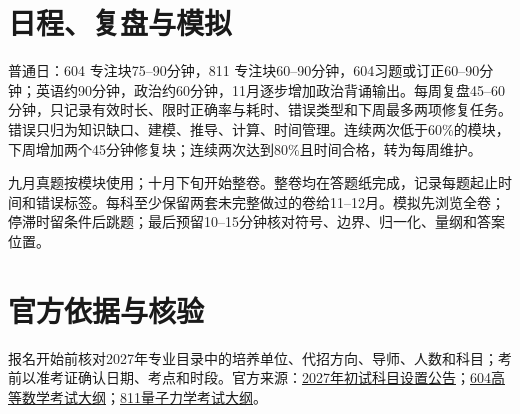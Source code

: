 \documentclass[UTF8,a4paper]{ctexart}
\begin{document}
\section{日程、复盘与模拟}
普通日：604 专注块75--90分钟，811 专注块60--90分钟，604习题或订正60--90分钟；英语约90分钟，政治约60分钟，11月逐步增加政治背诵输出。每周复盘45--60分钟，只记录有效时长、限时正确率与耗时、错误类型和下周最多两项修复任务。错误只归为知识缺口、建模、推导、计算、时间管理。连续两次低于60\%的模块，下周增加两个45分钟修复块；连续两次达到80\%且时间合格，转为每周维护。

九月真题按模块使用；十月下旬开始整卷。整卷均在答题纸完成，记录每题起止时间和错误标签。每科至少保留两套未完整做过的卷给11--12月。模拟先浏览全卷；停滞时留条件后跳题；最后预留10--15分钟核对符号、边界、归一化、量纲和答案位置。

\section{官方依据与核验}
报名开始前核对2027年专业目录中的培养单位、代招方向、导师、人数和科目；考前以准考证确认日期、考点和时段。官方来源：\href{https://admission.ucas.ac.cn/showarticle/Article/4c7e0e9f-2311-47a0-8f12-b0ec992078ac/7d50f7f5-0125-4410-93a3-2b2b6917f0dd}{2027年初试科目设置公告}；\href{https://admission.ucas.ac.cn/Content/Upload/2026/7/29.pdf}{604高等数学考试大纲}；\href{https://admission.ucas.ac.cn/Content/Upload/2025/7/811%20%E9%87%8F%E5%AD%90%E5%8A%9B%E5%AD%A6.pdf}{811量子力学考试大纲}。
\end{document}
